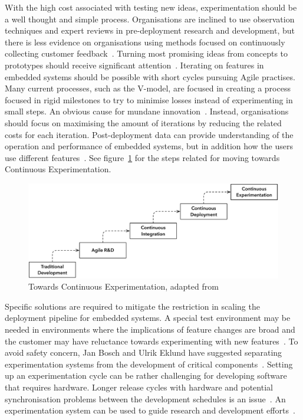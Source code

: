 \documentclass[english]{tktltiki2}
\begin{document}
With the high cost associated with testing new ideas, experimentation should be a well thought and simple process. Organisations are inclined to use observation techniques and expert reviews in pre-deployment research and development, but there is less evidence on organisations using methods focused on continuously collecting customer feedback~\cite{HB14}. Turning most promising ideas from concepts to prototypes should receive significant attention~\cite{BE12}. Iterating on features in embedded systems should be possible with short cycles pursuing Agile practises. Many current processes, such as the V-model, are focused in creating a process focused in rigid milestones to try to minimise losses instead of experimenting in small steps. An obvious cause for mundane innovation~\cite{BE12}. Instead, organisations should focus on maximising the amount of iterations by reducing the related costs for each iteration. Post-deployment data can provide understanding of the operation and performance of embedded systems, but in addition how the users use different features~\cite{BE12, HB14}. See figure~\ref{figure:towards-continuous-experimentation} for the steps related for moving towards Continuous Experimentation.

\begin{figure}[h!]

    \centering
    \vspace{1cm}

    \includegraphics[width = \textwidth]{figures/towards-continuous-experimentation}

    \caption{Towards Continuous Experimentation, adapted from~\cite{HAB12}}
    \label{figure:towards-continuous-experimentation}

    \vspace{1cm}

\end{figure}

Specific solutions are required to mitigate the restriction in scaling the deployment pipeline for embedded systems. A special test environment may be needed in environments where the implications of feature changes are broad and the customer may have reluctance towards experimenting with new features~\cite{FGM14}. To avoid safety concern, Jan Bosch and Ulrik Eklund have suggested separating experimentation systems from the development of critical components~\cite{BE12}. Setting up an experimentation cycle can be rather challenging for developing software that requires hardware. Longer release cycles with hardware and potential synchronisation problems between the development schedules is an issue~\cite{FGM14}. An experimentation system can be used to guide research and development efforts~\cite{HAB12}.
\end{document}
